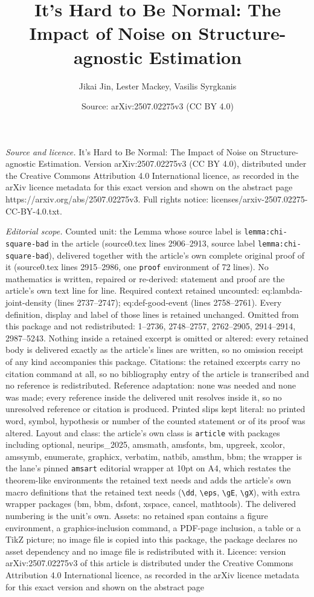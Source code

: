 \documentclass[10pt,a4paper]{amsart}
\title[It's Hard to Be Normal: The Impact of Noise on Structure-agn]{It's Hard to Be Normal: The Impact of Noise on Structure-agnostic Estimation}
\author{Jikai Jin, Lester Mackey, Vasilis Syrgkanis}
\date{Source: arXiv:2507.02275v3 (CC BY 4.0)}
\begin{document}
\maketitle

\noindent\emph{Source and licence.} It's Hard to Be Normal: The Impact of Noise on Structure-agnostic Estimation. Version arXiv:2507.02275v3 (CC BY 4.0), distributed under the Creative Commons Attribution 4.0 International licence, as recorded in the arXiv licence metadata for this exact version and shown on the abstract page https://arxiv.org/abs/2507.02275v3. Full rights notice: licenses/arxiv-2507.02275-CC-BY-4.0.txt.\par\smallskip

\noindent\textit{Editorial scope.} Counted unit: the Lemma whose source label is \texttt{lemma:chi-square-bad} in the article (source0.tex lines 2906--2913, source label \texttt{lemma:chi-square-bad}), delivered together with the article's own complete original proof of it (source0.tex lines 2915--2986, one \texttt{proof} environment of 72 lines). No mathematics is written, repaired or re-derived: statement and proof are the article's own text line for line. Required context retained uncounted: eq:lambda-joint-density (lines 2737--2747); eq:def-good-event (lines 2758--2761). Every definition, display and label of those lines is retained unchanged. Omitted from this package and not redistributed: 1--2736, 2748--2757, 2762--2905, 2914--2914, 2987--5243. Nothing inside a retained excerpt is omitted or altered: every retained body is delivered exactly as the article's lines are written, so no omission receipt of any kind accompanies this package. Citations: the retained excerpts carry no citation command at all, so no bibliography entry of the article is transcribed and no reference is redistributed. Reference adaptation: none was needed and none was made; every reference inside the delivered unit resolves inside it, so no unresolved reference or citation is produced. Printed slips kept literal: no printed word, symbol, hypothesis or number of the counted statement or of its proof was altered. Layout and class: the article's own class is \texttt{article} with packages including optional, neurips\_2025, amsmath, amsfonts, bm, upgreek, xcolor, amssymb, enumerate, graphicx, verbatim, natbib, amsthm, bbm; the wrapper is the lane's pinned \texttt{amsart} editorial wrapper at 10pt on A4, which restates the theorem-like environments the retained text needs and adds the article's own macro definitions that the retained text needs (\texttt{\textbackslash dd}, \texttt{\textbackslash eps}, \texttt{\textbackslash gE}, \texttt{\textbackslash gX}), with extra wrapper packages (bm, bbm, dsfont, xspace, cancel, mathtools). The delivered numbering is the unit's own. Assets: no retained span contains a figure environment, a graphics-inclusion command, a PDF-page inclusion, a table or a TikZ picture; no image file is copied into this package, the package declares no asset dependency and no image file is redistributed with it. Licence: version arXiv:2507.02275v3 of this article is distributed under the Creative Commons Attribution 4.0 International licence, as recorded in the arXiv licence metadata for this exact version and shown on the abstract page 
\end{document}
